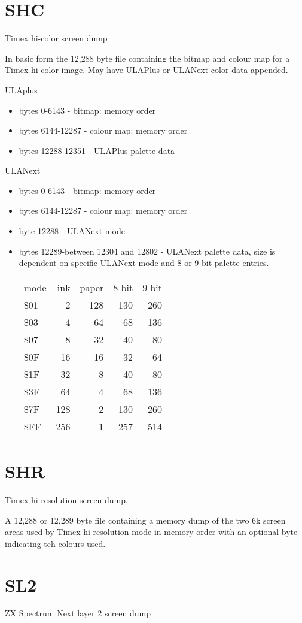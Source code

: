 \section{SHC}
Timex hi-color screen dump

In basic form the 12,288 byte file containing the bitmap and colour
map for a Timex hi-color image. May have ULAPlus or ULANext color data
appended.

ULAplus
\begin{itemize}
\item bytes 0-6143 - bitmap: memory order
\item bytes 6144-12287 - colour map: memory order
\item bytes 12288-12351 - ULAPlus palette data
\end{itemize}
ULANext
\begin{itemize}
\item bytes 0-6143 - bitmap: memory order
\item bytes 6144-12287 - colour map: memory order
\item byte 12288 - ULANext mode
\item bytes 12289-between 12304 and 12802 - ULANext palette data, size
  is dependent on specific ULANext mode and 8 or 9 bit palette entries.
  \begin{tabular}{l | r | r | r | r}
    mode & ink & paper & 8-bit & 9-bit \\
    \$01 & 2 & 128 & 130 & 260\\
    \$03 & 4 & 64 & 68 & 136\\
    \$07 & 8 & 32 & 40 & 80\\
    \$0F & 16 & 16 & 32 & 64\\
    \$1F & 32 & 8 & 40 & 80\\
    \$3F & 64 & 4 & 68 & 136\\
    \$7F & 128 & 2 & 130 & 260\\
    \$FF & 256 & 1 & 257 & 514
  \end{tabular}
\end{itemize}
\section{SHR}
  
Timex hi-resolution screen dump.

A 12,288 or 12,289 byte file containing a memory dump of the two 6k
screen areas used by Timex hi-resolution mode in memory order with an
optional byte indicating teh colours used.
\section{SL2}
ZX Spectrum Next layer 2 screen dump


